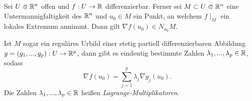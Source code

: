 \documentclass{cheat-sheet}
\newcommand\opn{\mathrel{\ooalign{$\subset$\cr
  \hidewidth\raise.1ex\hbox{$\circ\mkern.5mu$}\cr}}}
\begin{document}
\begin{satz}
Sei $U \opn \R^n$ offen und $f : U \to \mathbb{R}$ differenzierbar. Ferner sei $M \subset U \opn \R^n$ eine Untermannigfaltigkeit des $\mathbb{R}^n$ und $u_0 \in M$ ein Punkt, an welchem $f\mid_M$ ein lokales Extremum annimmt. Dann gilt $\nabla f(u_0) \in N_{u_0} M$.

Ist $M$ sogar ein reguläres Urbild einer stetig partiell differenzierbaren Abbildung $ g = (g_1, ..., g_p) : U \to \mathbb{R}^p$, dann gibt es eindeutig bestimmte Zahlen $\lambda_1, ..., \lambda_p \in \mathbb{R}$, sodass
\[ \nabla f(u_0) = \sum_{j = 1}^{p} \lambda_j \nabla g_j(u_0). \]
Die Zahlen $\lambda_1, ..., \lambda_p \in \mathbb{R}$ heißen \emph{Lagrange-Multiplikatoren}.
\end{satz}
\end{document}
